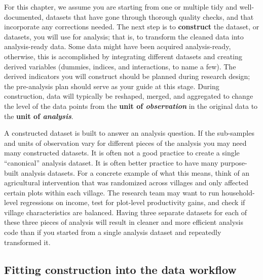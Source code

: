 For this chapter, we assume you are starting from 
one or multiple tidy\cite{hadley2017R}
and well-documented, 
datasets that have gone through thorough quality checks,
and that incorporate any corrections needed.
The next step is to \textbf{construct}
the dataset, or datasets, you will use for analysis;
that is, to transform the cleaned data into analysis-ready data.
Some data might have been acquired analysis-ready,
otherwise, this is accomplished by integrating different datasets
and creating derived variables
(dummies, indices, and interactions, to name a few).
The derived indicators you will construct should be
planned during research design;
the pre-analysis plan should serve as your guide
at this stage.
During construction, data will typically be
reshaped, merged, and aggregated to change the level of the data points
from the \textbf{unit of \textit{observation}} in the original data
to the \textbf{unit of \textit{analysis}}.

A constructed dataset is built to answer an analysis question.
If the sub-samples and units of observation 
vary for different pieces of the analysis
you may need many constructed datasets.
It is often not a good practice
to create a single ``canonical'' analysis dataset.
It is often better practice to have 
many purpose-built analysis datasets.
For a concrete example of what this means,
think of an agricultural intervention 
that was randomized across villages
and only affected certain plots within each village.
The research team may want to 
run household-level regressions on income,
test for plot-level productivity gains,
and check if village characteristics are balanced.
Having three separate datasets for each of these three pieces of analysis
will result in cleaner and more efficient analysis code than if
you started from a single analysis dataset and repeatedly transformed it.

\subsection{Fitting construction into the data workflow}

